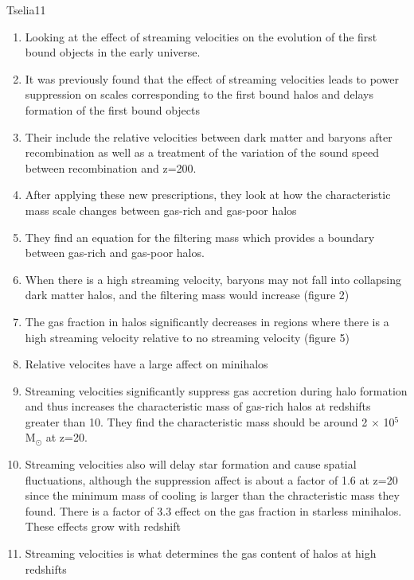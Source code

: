 \documentclass[a4paper,fleqn,usenatbib]{mnras}
\begin{document}
\li Tselia11
\begin{enumerate}
	\item Looking at the effect of streaming velocities on the evolution of the first bound objects in the early universe.
	\item It was previously found that the effect of streaming velocities leads to power suppression on scales corresponding to the first bound halos and delays formation of the first bound objects
	\item Their include the relative velocities between dark matter and baryons after recombination as well as a treatment of the variation of the sound speed between recombination and z=200. 
	\item After applying these new prescriptions, they look at how the characteristic mass scale changes between gas-rich and gas-poor halos
	\item They find an equation for the filtering mass which provides a boundary between gas-rich and gas-poor halos.
	\item When there is a high streaming velocity, baryons may not fall into collapsing dark matter halos, and the filtering mass would increase (figure 2)
	\item The gas fraction in halos significantly decreases in regions where there is a high streaming velocity relative to no streaming velocity (figure 5)
	\item Relative velocites have a large affect on minihalos
	\item Streaming velocities significantly suppress gas accretion during halo formation and thus increases the characteristic mass of gas-rich halos at redshifts greater than 10. They find the characteristic mass should be around 2 $\times$ 10$^{5}$ M$_{\odot}$ at z=20. 
	\item Streaming velocities also will delay star formation and cause spatial fluctuations, although the suppression affect is about a factor of 1.6 at z=20 since the minimum mass of \hh{} cooling is larger than the chracteristic mass they found. There is a factor of 3.3 effect on the gas fraction in starless minihalos. These effects grow with redshift
	\item Streaming velocities is what determines the gas content of halos at high redshifts
\end{enumerate}
\end{document}
